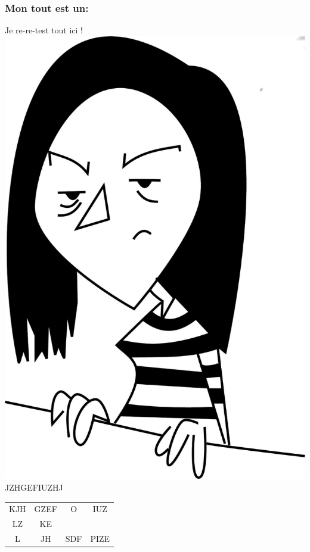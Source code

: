 \documentclass[10pt,a4paper]{report}
\begin{document}
\subsubsection{Mon tout est un:}
Je re-re-test tout ici !
\includegraphics{Mini_Amel.png}
JZHGEFIUZHJ

\begin{tabular}{cccc}
KJH & GZEF & O & IUZ \\
LZ & KE & & \\
L & JH & SDF & PIZE \\
\end{tabular}

\tableofcontents
\end{document}
